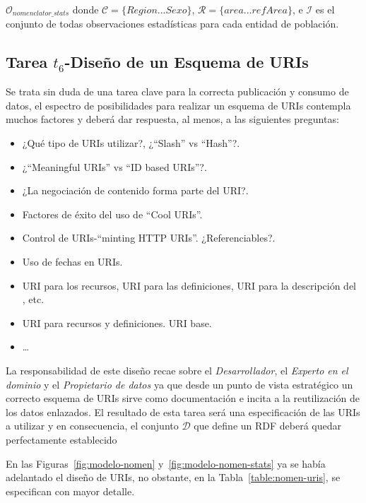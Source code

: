 $\mathcal{O}_{nomenclator\_stats}$  donde $\mathcal{C} = \{Region...Sexo\}$, $\mathcal{R} = \{area...refArea\}$,
e $\mathcal{I}$ es el conjunto de todas observaciones estadísticas para cada entidad de población.

\subsection{Tarea $t_6$-Diseño de un Esquema de URIs}
Se trata sin duda de una tarea clave para la correcta publicación y consumo de datos, el espectro de posibilidades
para realizar un esquema de \gls{URI}s contempla muchos factores y deberá dar respuesta, al menos, a las
siguientes preguntas:

\begin{itemize}
 \item ¿Qué tipo de URIs utilizar?, ¿``Slash'' vs ``Hash''?.
 \item ¿``Meaningful URIs'' vs ``ID based URIs''?.
 \item ¿La negociación de contenido forma parte del URI?.
 \item Factores de éxito del uso de ``Cool URIs''.
 \item Control de URIs-``minting \gls{HTTP URI}s''. ¿Referenciables?.
 \item Uso de fechas en URIs. 
 \item URI para los recursos, URI para las definiciones, URI para la descripción del \dataset, etc.
 \item URI para recursos y definiciones. URI base.
 \item \ldots
\end{itemize}

La responsabilidad de este diseño recae sobre el \textit{Desarrollador}, el \textit{Experto en el dominio} y el \textit{Propietario de datos} ya que desde 
un punto de vista estratégico un correcto esquema de URIs sirve como documentación e incita a la reutilización de los datos enlazados. 
El resultado de esta tarea será una especificación de las URIs a utilizar y en consecuencia, el conjunto $\mathcal{D}$ que define un \dataset \gls{RDF} 
deberá quedar perfectamente establecido

En las Figuras~\ref{fig:modelo-nomen} y~\ref{fig:modelo-nomen-stats} ya se había adelantado el diseño de URIs, no obstante, en la Tabla~\ref{table:nomen-uris}, 
se especifican con mayor detalle.

